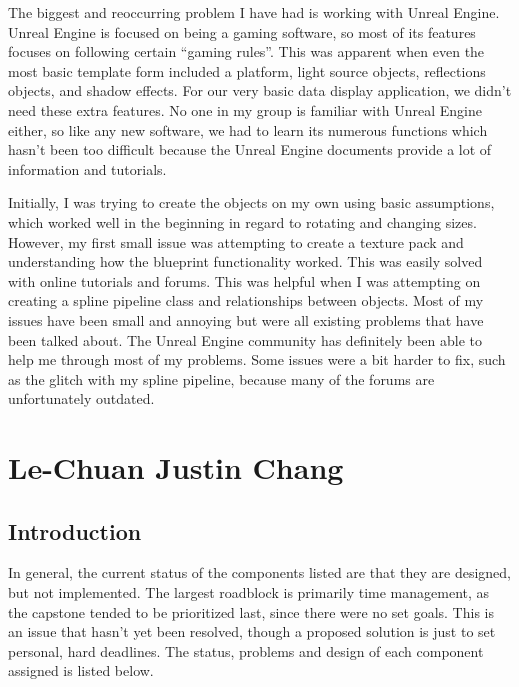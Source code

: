 \documentclass[onecolumn, draftclsnofoot, 10pt, compsoc]{IEEEtran}
\begin{document}
\begin{singlespace}
The biggest and reoccurring problem I have had is working with Unreal Engine. Unreal Engine is focused on being a gaming software, so most of its features focuses on following certain “gaming rules”. This was apparent when even the most basic template form included a platform, light source objects, reflections objects, and shadow effects. For our very basic data display application, we didn't need these extra features. No one in my group is familiar with Unreal Engine either, so like any new software, we had to learn its numerous functions which hasn't been too difficult because the Unreal Engine documents provide a lot of information and tutorials. 

Initially, I was trying to create the objects on my own using basic assumptions, which worked well in the beginning in regard to rotating and changing sizes. However, my first small issue was attempting to create a texture pack and understanding how the blueprint functionality worked. This was easily solved with online tutorials and forums. This was helpful when I was attempting on creating a spline pipeline class and relationships between objects. Most of my issues have been small and annoying but were all existing problems that have been talked about. The Unreal Engine community has definitely been able to help me through most of my problems. Some issues were a bit harder to fix, such as the glitch with my spline pipeline, because many of the forums are unfortunately outdated. 
\end{singlespace}
\section{Le-Chuan Justin Chang}
\subsection{Introduction}
\begin{singlespace}
In general, the current status of the components listed are that they are designed, but not implemented. The largest roadblock is primarily time management, as the capstone tended to be prioritized last, since there were no set goals. This is an issue that hasn't yet been resolved, though a proposed solution is just to set personal, hard deadlines. The status, problems and design of each component assigned is listed below.
\end{singlespace}
\end{document}
